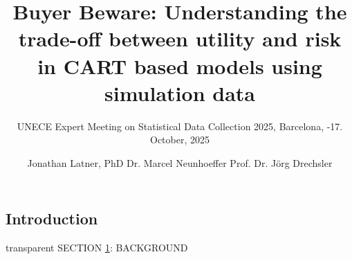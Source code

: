 \documentclass[t,8pt,utfx8]{beamer}
\title{Buyer Beware: Understanding the trade-off between utility and risk in CART based models using simulation data}
\subtitle{
UNECE Expert Meeting on Statistical Data Collection 2025, \newline Barcelona, \newline 15-17. October, 2025}
\author{Jonathan Latner, PhD \newline Dr. Marcel Neunhoeffer \newline Prof. Dr. Jörg Drechsler}
\begin{document}
\frame[plain]{\titlepage}

\begin{spacing}{1.25}

\section{Introduction}\label{sec:introduction}

\begin{frame}[c,plain]
\vskip-4mm
\begin{beamercolorbox}[wd=\boxwidth,ht=22.11mm]{transparent}%
    \vfill%
    \leftinsert%
    \MakeUppercase{Section \ref{sec:introduction}: Background
} %
\end{beamercolorbox}
\vskip-3mm
\end{frame}


\end{spacing}
\end{document}
